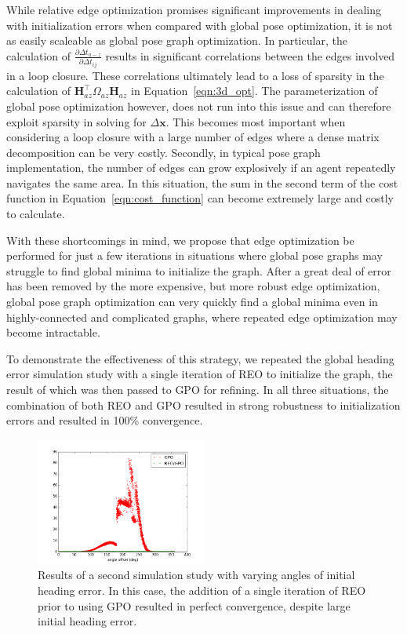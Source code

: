 While relative edge optimization promises significant improvements in dealing with initialization errors when compared with global pose optimization, it is not as easily scaleable as global pose graph optimization.  In particular, the calculation of $\frac {\partial\Delta t_{a-z}}{\partial\Delta t_{ij}}$ results in significant correlations between the edges involved in a loop closure.  These correlations ultimately lead to a loss of sparsity in the calculation of $\mathbf{H}_{az}^\top \Omega_{az} \mathbf{H}_{az}$ in Equation~\ref{eqn:3d_opt}.  The parameterization of global pose optimization however, does not run into this issue and can therefore exploit sparsity in solving for $\Delta \mathbf{x}$.  This becomes most important when considering a loop closure with a large number of edges where a dense matrix decomposition can be very costly. Secondly, in typical pose graph implementation, the number of edges can grow explosively if an agent repeatedly navigates the same area.  In this situation, the sum in the second term of the cost function in Equation~\ref{eqn:cost_function} can become extremely large and costly to calculate.

With these shortcomings in mind, we propose that edge optimization be performed for just a few iterations in situations where global pose graphs may struggle to find global minima to initialize the graph.  After a great deal of error has been removed by the more expensive, but more robust edge optimization, global pose graph optimization can very quickly find a global minima even in highly-connected and complicated graphs, where repeated edge optimization may become intractable.

To demonstrate the effectiveness of this strategy, we repeated the global heading error simulation study with a single iteration of REO to initialize the graph, the result of which was then passed to GPO for refining.  In all three situations, the combination of both REO and GPO resulted in strong robustness to initialization errors and resulted in 100\% convergence.

\begin{figure}[H]
  \includegraphics[width=0.5\textwidth]{figures/combined_global_heading_results.png}
  \caption{Results of a second simulation study with varying angles of initial heading error.  In this case, the addition of a single iteration of REO prior to using GPO resulted in perfect convergence, despite large initial heading error.}
  \label{fig:combined_global_heading_results}
\end{figure}

